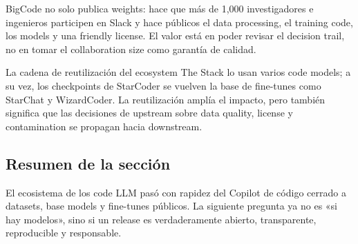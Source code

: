 BigCode no solo publica weights: hace que más de 1,000 investigadores e ingenieros participen en Slack y hace públicos el data processing, el training code, los models y una friendly license. El valor está en poder revisar el decision trail, no en tomar el collaboration size como garantía de calidad.



\begin{importantbox}{La cadena de reutilización del ecosystem}
The Stack lo usan varios code models; a su vez, los checkpoints de StarCoder se vuelven la base de fine-tunes como StarChat y WizardCoder. La reutilización amplía el impacto, pero también significa que las decisiones de upstream sobre data quality, license y contamination se propagan hacia downstream.
\end{importantbox}


\subsection{Resumen de la sección}

El ecosistema de los code LLM pasó con rapidez del Copilot de código cerrado a datasets, base models y fine-tunes públicos. La siguiente pregunta ya no es «si hay modelos», sino si un release es verdaderamente abierto, transparente, reproducible y responsable.
